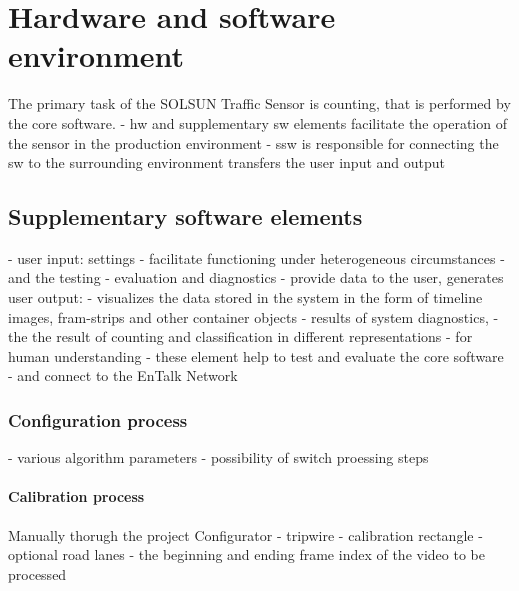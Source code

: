 \chapter{Hardware and software environment}\label{chap:Environment}
The primary task of the SOLSUN Traffic Sensor is counting, that is performed by the core software.
- hw and supplementary sw elements facilitate the operation of the sensor in the production environment
- ssw is responsible for connecting the sw to the surrounding environment transfers the user input and output
\section{Supplementary software elements}\label{sec:SupplementarySoftware}
- user input: settings
- facilitate functioning under heterogeneous circumstances
- and the testing
- evaluation and diagnostics
- provide data to the user, generates user output: 
- visualizes the data stored in the system in the form of timeline images, fram-strips and other container objects 
- results of system diagnostics, 
- the the result of counting and classification in different representations
- for human understanding
- these element help to test and evaluate the core software
- and connect to the EnTalk Network
\subsection{Configuration process}\label{subs:ProjectConfigurator}
- various algorithm parameters
- possibility of switch proessing steps

\subsubsection{Calibration process}
Manually thorugh the project Configurator
- tripwire
- calibration rectangle
- optional road lanes
- the beginning and ending frame index of the video to be processed
